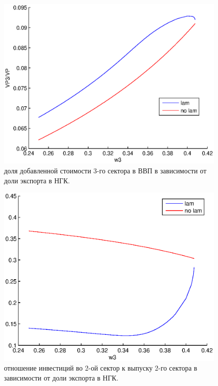 \documentclass[12pt]{article}
\theoremstyle{rusdef}
\begin{document}
\begin{figure}[h!]
	\centering
	\includegraphics[scale=0.8]{pics/w3_VP3-VP.eps}
	\caption{доля добавленной стоимости 3-го сектора в ВВП в зависимости от доли
		экспорта в НГК.}
\end{figure}
\begin{figure}[h!]
	\centering
	\includegraphics[scale=0.8]{pics/w3_unknown2.eps}
	\caption{отношение инвестиций во 2-ой сектор к выпуску 2-го сектора в зависимости от доли экспорта в НГК.}
\end{figure}
\end{document}
